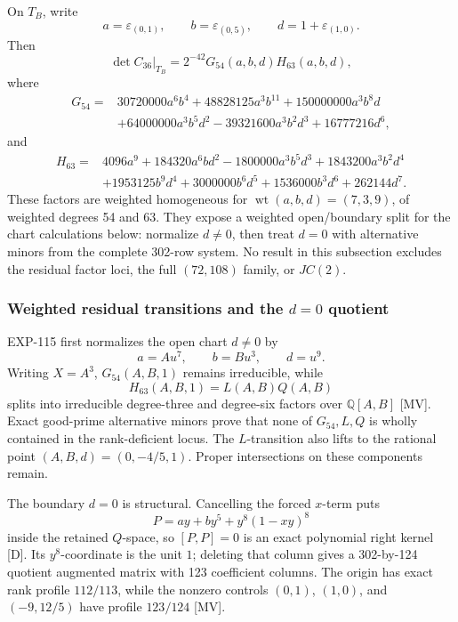 \documentclass[11pt]{article}
\theoremstyle{remark}
\begin{document}
On \(T_B\), write
\[
a=\varepsilon_{(0,1)},\qquad
b=\varepsilon_{(0,5)},\qquad
d=1+\varepsilon_{(1,0)}.
\]
Then
\[
\det C_{36}|_{T_B}=2^{-42}G_{54}(a,b,d)H_{63}(a,b,d),
\]
where
\[
\begin{aligned}
G_{54}={}&30720000a^6b^4+48828125a^3b^{11}
+150000000a^3b^8d\\
&+64000000a^3b^5d^2-39321600a^3b^2d^3
+16777216d^6,
\end{aligned}
\]
and
\[
\begin{aligned}
H_{63}={}&4096a^9+184320a^6bd^2-1800000a^3b^5d^3
+1843200a^3b^2d^4\\
&+1953125b^9d^4+3000000b^6d^5+1536000b^3d^6
+262144d^7.
\end{aligned}
\]
These factors are weighted homogeneous for
\(\operatorname{wt}(a,b,d)=(7,3,9)\), of weighted degrees 54 and 63.
They expose a weighted open/boundary split for the chart calculations below:
normalize \(d\ne0\), then treat \(d=0\) with alternative minors from the
complete 302-row system. No result in this subsection excludes the residual
factor loci, the full \((72,108)\) family, or \(JC(2)\).

\subsubsection{Weighted residual transitions and the \texorpdfstring{\(d=0\)}{d=0} quotient}

EXP-115 first normalizes the open chart \(d\ne0\) by
\[
a=A u^7,\qquad b=B u^3,\qquad d=u^9.
\]
Writing \(X=A^3\), \(G_{54}(A,B,1)\) remains irreducible, while
\[
H_{63}(A,B,1)=L(A,B)Q(A,B)
\]
splits into irreducible degree-three and degree-six factors over
\(\mathbb Q[A,B]\) [MV]. Exact good-prime alternative minors prove that none
of \(G_{54},L,Q\) is wholly contained in the rank-deficient locus. The
\(L\)-transition also lifts to the rational point
\((A,B,d)=(0,-4/5,1)\). Proper intersections on these components remain.

The boundary \(d=0\) is structural. Cancelling the forced \(x\)-term puts
\[
P=a y+b y^5+y^8(1-xy)^8
\]
inside the retained \(Q\)-space, so \([P,P]=0\) is an exact polynomial right
kernel [D]. Its \(y^8\)-coordinate is the unit \(1\); deleting that column
gives a 302-by-124 quotient augmented matrix with 123 coefficient columns.
The origin has exact rank profile \(112/113\), while the nonzero controls
\((0,1)\), \((1,0)\), and \((-9,12/5)\) have profile \(123/124\) [MV].
\end{document}
